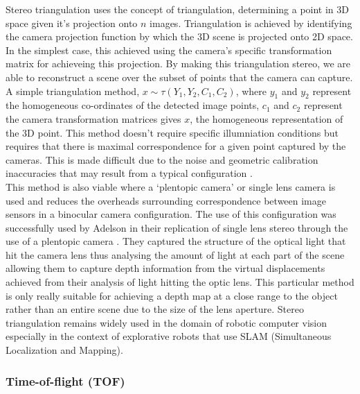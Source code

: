 Stereo triangulation uses the concept of triangulation, determining a point in 3D space given it's projection onto $n$ images. Triangulation is achieved by identifying the camera projection function by which the 3D scene is projected onto 2D space. In the simplest case, this achieved using the camera's specific transformation matrix for achieveing this projection. By making this triangulation stereo, we are able to reconstruct a scene over the subset of points that the camera can capture. A simple triangulation method, $x \sim \tau(Y_1,Y_2,C_1,C_2)$, where $y_1$ and $y_2$ represent the homogeneous co-ordinates of the detected image points, $c_1$ and $c_2$ represent the camera transformation matrices gives $x$, the homogeneous representation of the 3D point. This method doesn't require specific illumniation conditions but requires that there is maximal correspondence for a given point captured by the cameras. This is made difficult due to the noise and geometric calibration inaccuracies that may result from a typical configuration \cite{Hausler1993}. \\

This method is also viable where a `plentopic camera' or single lens camera is used and reduces the overheads surrounding correspondence between image sensors in a binocular camera configuration. The use of this configuration was successfully used by Adelson in their replication of single lens stereo through the use of a plentopic camera \cite{Adelson1992}. They captured the structure of the optical light that hit the camera lens thus analysing the amount of light at each part of the scene allowing them to capture depth information from the virtual displacements achieved from their analysis of light hitting the optic lens. This particular method is only really suitable for achieving a depth map at a close range to the object rather than an entire scene due to the size of the lens aperture. Stereo triangulation remains widely used in the domain of robotic computer vision especially in the context of explorative robots that use SLAM (Simultaneous Localization and Mapping).

\subsubsection{Time-of-flight (TOF)}


